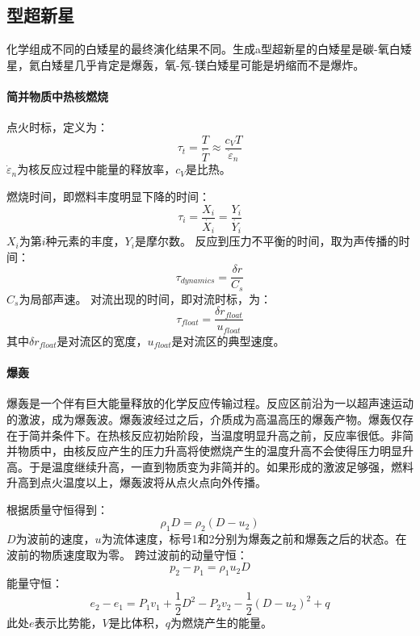 \subsection{型超新星}
化学组成不同的白矮星的最终演化结果不同。生成a型超新星的白矮星是碳-氧白矮星，氦白矮星几乎肯定是爆轰，氧-氖-镁白矮星可能是坍缩而不是爆炸。
\paragraph{简并物质中热核燃烧}
点火时标，定义为：
\begin{equation}
	\tau_{t}=\frac{T}{\dot{T}}\approx \frac{c_{V}T}{\dot{\varepsilon}_{n}}
\end{equation}
$\dot{\varepsilon}_{n}$为核反应过程中能量的释放率，$c_{V}$是比热。

燃烧时间，即燃料丰度明显下降的时间：
\begin{equation}
	\tau_{i}=\frac{X_{i}}{\dot{X_{i}}}=\frac{Y_{i}}{\dot{Y_{i}}}
\end{equation}
$X_{i}$为第$i$种元素的丰度，$Y_{i}$是摩尔数。
反应到压力不平衡的时间，取为声传播的时间：
\begin{equation}
	\tau_{dynamics}=\frac{\delta r}{C_{s}}
\end{equation}
$C_{s}$为局部声速。
对流出现的时间，即对流时标，为：
\begin{equation}
	\tau_{float}=\frac{\delta r_{float}}{u_{float}}
\end{equation}
其中$\delta r_{float}$是对流区的宽度，$u_{float}$是对流区的典型速度。
\paragraph{爆轰}爆轰是一个伴有巨大能量释放的化学反应传输过程。反应区前沿为一以超声速运动的激波，成为爆轰波。爆轰波经过之后，介质成为高温高压的爆轰产物。爆轰仅存在于简并条件下。在热核反应初始阶段，当温度明显升高之前，反应率很低。非简并物质中，由核反应产生的压力升高将使燃烧产生的温度升高不会使得压力明显升高。于是温度继续升高，一直到物质变为非简并的。如果形成的激波足够强，燃料升高到点火温度以上，爆轰波将从点火点向外传播。

根据质量守恒得到：
\begin{equation}
	\rho_{1}D=\rho_{2}(D-u_{2})
\end{equation}
$D$为波前的速度，$u$为流体速度，标号1和2分别为爆轰之前和爆轰之后的状态。在波前的物质速度取为零。
跨过波前的动量守恒：
\begin{equation}
	p_{2}-p_{1}=\rho_{1} u_{2}D
\end{equation}
能量守恒：
\begin{equation}
	e_{2}-e_{1}=P_{1}v_{1}+\frac{1}{2}D^2-P_{2}v_{2}-\frac{1}{2}\left(D-u_{2}\right)^2+q
\end{equation}
此处$e$表示比势能，$V$是比体积，$q$为燃烧产生的能量。

